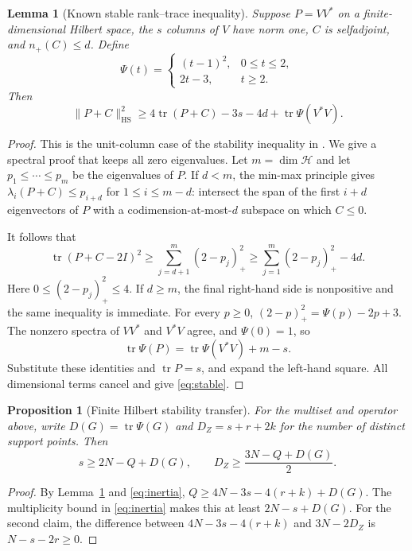 \documentclass[11pt]{article}
\newtheorem{proposition}[theorem]{Proposition}
\newtheorem{lemma}[theorem]{Lemma}
\theoremstyle{remark}
\DeclareMathOperator{\tr}{tr}
\newcommand{\HS}{\mathrm{HS}}
\begin{document}
\begin{lemma}[Known stable rank--trace inequality]\label{lem:stable}
Suppose $P=VV^*$ on a finite-dimensional Hilbert space, the $s$ columns of
$V$ have norm one, $C$ is selfadjoint, and $n_+(C)\le d$. Define
\[
 \Psi(t)=\begin{cases}(t-1)^2,&0\le t\le2,\\2t-3,&t\ge2.
 \end{cases}
\]
Then
\begin{equation}\label{eq:stable}
 \|P+C\|_{\HS}^2\ge4\tr(P+C)-3s-4d+\tr\Psi(V^*V).
\end{equation}
\end{lemma}
\begin{proof}
This is the unit-column case of the stability inequality in
\cite[Section 2]{Ainta}. We give a spectral proof that keeps all zero
eigenvalues. Let $m=\dim\mathcal H$ and let $p_1\le\cdots\le p_m$ be the
eigenvalues of $P$. If $d<m$, the min-max principle gives
$\lambda_i(P+C)\le p_{i+d}$ for $1\le i\le m-d$: intersect the span
of the first $i+d$ eigenvectors of $P$ with a codimension-at-most-$d$
subspace on which $C\le0$.

It follows that
\[
 \tr(P+C-2I)^2\ge\sum_{j=d+1}^m(2-p_j)_+^2
 \ge\sum_{j=1}^m(2-p_j)_+^2-4d.
\]
Here $0\le(2-p_j)_+^2\le4$. If $d\ge m$, the final right-hand side is
nonpositive and the same inequality is immediate. For every $p\ge0$,
$(2-p)_+^2=\Psi(p)-2p+3$. The nonzero spectra of $VV^*$ and $V^*V$
agree, and $\Psi(0)=1$, so
\[
 \tr\Psi(P)=\tr\Psi(V^*V)+m-s.
\]
Substitute these identities and $\tr P=s$, and expand the left-hand
square. All dimensional terms cancel and give \eqref{eq:stable}.
\end{proof}

\begin{proposition}[Finite Hilbert stability transfer]\label{prop:finite}
For the multiset and operator above, write $D(G)=\tr\Psi(G)$ and
$D_Z=s+r+2k$ for the number of distinct support points. Then
\begin{equation}\label{eq:finite}
 s\ge2N-Q+D(G),\qquad
 D_Z\ge\frac{3N-Q+D(G)}2.
\end{equation}
\end{proposition}
\begin{proof}
By Lemma~\ref{lem:stable} and \eqref{eq:inertia},
$Q\ge4N-3s-4(r+k)+D(G)$. The multiplicity bound in
\eqref{eq:inertia} makes this at least $2N-s+D(G)$. For the second
claim, the difference between $4N-3s-4(r+k)$ and $3N-2D_Z$ is
$N-s-2r\ge0$.
\end{proof}
\end{document}
